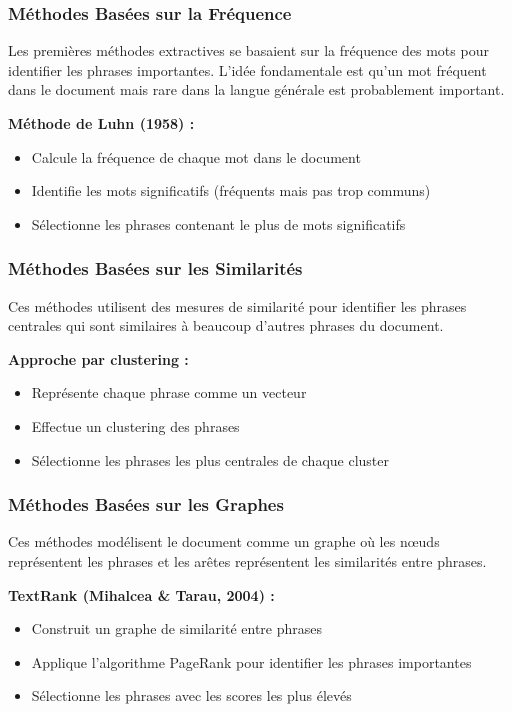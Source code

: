 \subsubsection{Méthodes Basées sur la Fréquence}

Les premières méthodes extractives se basaient sur la fréquence des mots pour identifier les phrases importantes. L'idée fondamentale est qu'un mot fréquent dans le document mais rare dans la langue générale est probablement important.

\textbf{Méthode de Luhn (1958) :}
\begin{itemize}
    \item Calcule la fréquence de chaque mot dans le document
    \item Identifie les mots significatifs (fréquents mais pas trop communs)
    \item Sélectionne les phrases contenant le plus de mots significatifs
\end{itemize}

\subsubsection{Méthodes Basées sur les Similarités}

Ces méthodes utilisent des mesures de similarité pour identifier les phrases centrales qui sont similaires à beaucoup d'autres phrases du document.

\textbf{Approche par clustering :}
\begin{itemize}
    \item Représente chaque phrase comme un vecteur
    \item Effectue un clustering des phrases
    \item Sélectionne les phrases les plus centrales de chaque cluster
\end{itemize}

\subsubsection{Méthodes Basées sur les Graphes}

Ces méthodes modélisent le document comme un graphe où les nœuds représentent les phrases et les arêtes représentent les similarités entre phrases.

\textbf{TextRank (Mihalcea \& Tarau, 2004) :}
\begin{itemize}
    \item Construit un graphe de similarité entre phrases
    \item Applique l'algorithme PageRank pour identifier les phrases importantes
    \item Sélectionne les phrases avec les scores les plus élevés
\end{itemize}

